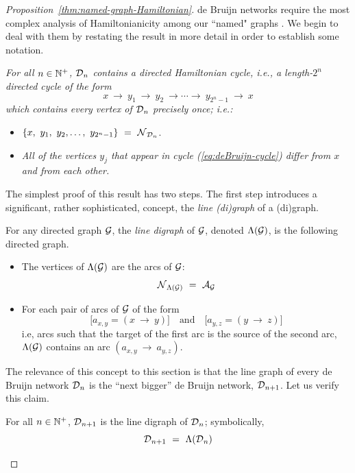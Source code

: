 \begin{proof}[Proposition~\ref{thm:named-graph-Hamiltonian}]
de Bruijn networks require the most complex analysis of Hamiltonianicity among our  ``named" graphs .  We begin to deal with them by restating the result in more detail in order to establish some notation.

\medskip

\noindent
{\em
For all $n \in \mathbb{N}^+$, $\mbox{$\cal D$}_n$ contains a {\em directed Hamiltonian cycle}, i.e., a length-$2^n$ 
directed cycle of the form}
\begin{equation}
\label{eq:deBruijn-cycle}
 x \ \rightarrow \ y_1 \ \rightarrow \ y_2 \ \rightarrow \cdots  \rightarrow \ y_{2^n-1} \ \rightarrow \ x
\end{equation}
{\em which contains every vertex of $\mbox{$\cal D$}_n$ precisely once; i.e.:}
\begin{itemize}
\item
$\{x, \ y_1, \ y_2, \ldots, \ y_{2^n-1}\} \ = \ \n_{\fd_n}$.
\medskip\item
{\em All of the vertices $y_j$ that appear in cycle (\ref{eq:deBruijn-cycle}) differ from $x$ and from each other.}
\end{itemize}

The simplest proof of this result has two steps.  The first step introduces a significant, rather
sophisticated, concept, the {\it line (di)graph} of a (di)graph.

\bigskip

 

For any directed graph $\mbox{$\cal G$}$, the {\it line digraph} of $\mbox{$\cal G$}$, denoted $\Lambda(\mbox{$\cal G$})$, is the following directed graph.
\begin{itemize}
\item
The vertices of $\Lambda(\mbox{$\cal G$})$ are the arcs of $\mbox{$\cal G$}$:
\[ \n_{{\Lambda}({\cal G})} \ = \ \a_{\fg} \]

\medskip\item
For each pair of arcs of $\mbox{$\cal G$}$ of the form
\[ \big[a_{x,y} = (x \ \rightarrow \ y) \big] \ \ \ \mbox{ and } \ \ \ 
\big[a_{y,z} = (y \ \rightarrow \ z) \big]
\]
i.e, arcs such that the target of the first arc is the source of the second arc, $\Lambda(\mbox{$\cal G$})$ contains an arc $(a_{x,y} \ \rightarrow \ a_{y,z})$.
\end{itemize}
The relevance of this concept to this section is that the line graph of every de Bruijn network $\mbox{$\cal D$}_n$ is the ``next bigger'' de Bruijn network, $\mbox{$\cal D$}_{n+1}$.  Let us verify this claim.

\begin{lemma}
\label{thm:deBruin-linegraph}
For all $n \in \mathbb{N}^+$, $\mbox{$\cal D$}_{n+1}$ is the line digraph of $\mbox{$\cal D$}_n$; symbolically,
\[ \mbox{$\cal D$}_{n+1} \ = \ \Lambda(\mbox{$\cal D$}_n) \]
\end{lemma}


\end{proof}
